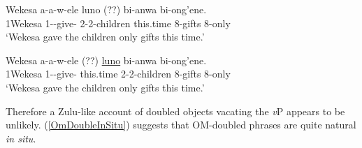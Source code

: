 \documentclass[output=paper]{langscibook}
\begin{document}
\ea 
\begin{xlist}

\ex \label{LunoBareObjectMoves}
\gll Wekesa a-a-w-ele  luno (??) bi-anwa bi-ong'ene. \\
1Wekesa 1\Sm-\Pst-give-\Pfv{} 2-2-children this.time {}  8-gifts 8-only \\
\glt `Wekesa gave the children only gifts this time.' 

\ex \label{OmDoubleInSitu}
\gll Wekesa a-a-w-ele (??) \underline{luno}  bi-anwa bi-ong'ene. \\
1Wekesa 1\Sm-\Om-give-\Pfv{} {} this.time 2-2-children 8-gifts 8-only \\
\glt `Wekesa gave the children only gifts this time.' 

\end{xlist}
\z 

Therefore a Zulu-like account of doubled objects vacating the \textit{v}P appears to be unlikely. (\ref{OmDoubleInSitu}) suggests that OM-doubled phrases are quite natural \textit{in situ}.






\end{document}

